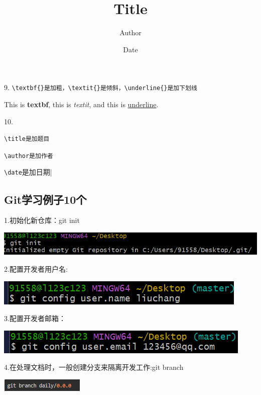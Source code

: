 \documentclass{article}
\begin{document}
	9.
	\verb|\textbf{}是加粗，\textit{}是倾斜，\underline{}是加下划线|
	
	This is \textbf{textbf}, this is \textit{textit}, and this is \underline{underline}.
	
	10.
	\title{Title} \verb|\title是加题目|
	
	\author{Author}\verb|\author是加作者|
	
	\date{Date}\verb|\date|是加日期|
	
	
	
	
	\subsection{Git学习例子10个}
	1.初始化新仓库：git init
	\noindent
	\begin{minipage}{\linewidth}
		\centering
		\includegraphics[width=0.5\linewidth]{init.png}
		\label{fig:example}
	\end{minipage}
	
	
	2.配置开发者用户名:
	\noindent
	\begin{minipage}{\linewidth}
		\centering
		\includegraphics[width=0.5\linewidth]{name.png}
	\end{minipage}
	
	3.配置开发者邮箱：
	
	\noindent
	\begin{minipage}{\linewidth}
		\centering
		\includegraphics[width=0.5\linewidth]{email.png}
	\end{minipage}
	
	4.在处理文档时，一般创建分支来隔离开发工作:git branch
	\noindent
	\begin{minipage}{\linewidth}
		\centering
		\includegraphics[width=0.5\linewidth]{daily.png}
		\label{fig:example}
	\end{minipage}
	
\end{document}
